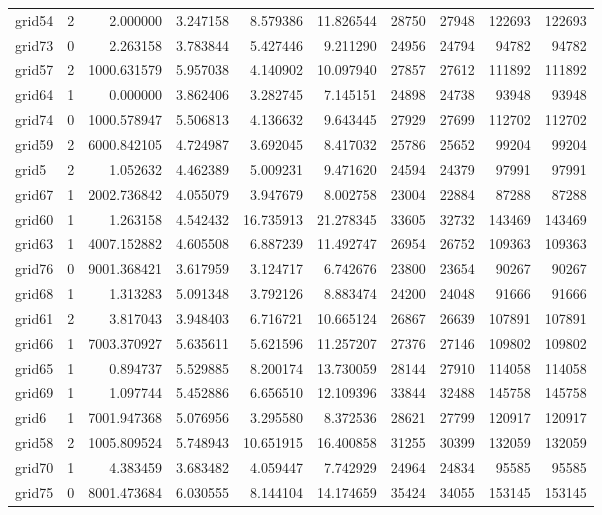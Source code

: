 \begin{longtable}{|l|r|r|r|r|r|r|r|r|r|}
grid54 & 2 & 2.000000 & 3.247158 & 8.579386 & 11.826544 & 28750 & 27948 & 122693 & 122693 \\
grid73 & 0 & 2.263158 & 3.783844 & 5.427446 & 9.211290 & 24956 & 24794 & 94782 & 94782 \\
grid57 & 2 & 1000.631579 & 5.957038 & 4.140902 & 10.097940 & 27857 & 27612 & 111892 & 111892 \\
grid64 & 1 & 0.000000 & 3.862406 & 3.282745 & 7.145151 & 24898 & 24738 & 93948 & 93948 \\
grid74 & 0 & 1000.578947 & 5.506813 & 4.136632 & 9.643445 & 27929 & 27699 & 112702 & 112702 \\
grid59 & 2 & 6000.842105 & 4.724987 & 3.692045 & 8.417032 & 25786 & 25652 & 99204 & 99204 \\
grid5 & 2 & 1.052632 & 4.462389 & 5.009231 & 9.471620 & 24594 & 24379 & 97991 & 97991 \\
grid67 & 1 & 2002.736842 & 4.055079 & 3.947679 & 8.002758 & 23004 & 22884 & 87288 & 87288 \\
grid60 & 1 & 1.263158 & 4.542432 & 16.735913 & 21.278345 & 33605 & 32732 & 143469 & 143469 \\
grid63 & 1 & 4007.152882 & 4.605508 & 6.887239 & 11.492747 & 26954 & 26752 & 109363 & 109363 \\
grid76 & 0 & 9001.368421 & 3.617959 & 3.124717 & 6.742676 & 23800 & 23654 & 90267 & 90267 \\
grid68 & 1 & 1.313283 & 5.091348 & 3.792126 & 8.883474 & 24200 & 24048 & 91666 & 91666 \\
grid61 & 2 & 3.817043 & 3.948403 & 6.716721 & 10.665124 & 26867 & 26639 & 107891 & 107891 \\
grid66 & 1 & 7003.370927 & 5.635611 & 5.621596 & 11.257207 & 27376 & 27146 & 109802 & 109802 \\
grid65 & 1 & 0.894737 & 5.529885 & 8.200174 & 13.730059 & 28144 & 27910 & 114058 & 114058 \\
grid69 & 1 & 1.097744 & 5.452886 & 6.656510 & 12.109396 & 33844 & 32488 & 145758 & 145758 \\
grid6 & 1 & 7001.947368 & 5.076956 & 3.295580 & 8.372536 & 28621 & 27799 & 120917 & 120917 \\
grid58 & 2 & 1005.809524 & 5.748943 & 10.651915 & 16.400858 & 31255 & 30399 & 132059 & 132059 \\
grid70 & 1 & 4.383459 & 3.683482 & 4.059447 & 7.742929 & 24964 & 24834 & 95585 & 95585 \\
grid75 & 0 & 8001.473684 & 6.030555 & 8.144104 & 14.174659 & 35424 & 34055 & 153145 & 153145 \\

\end{longtable}
